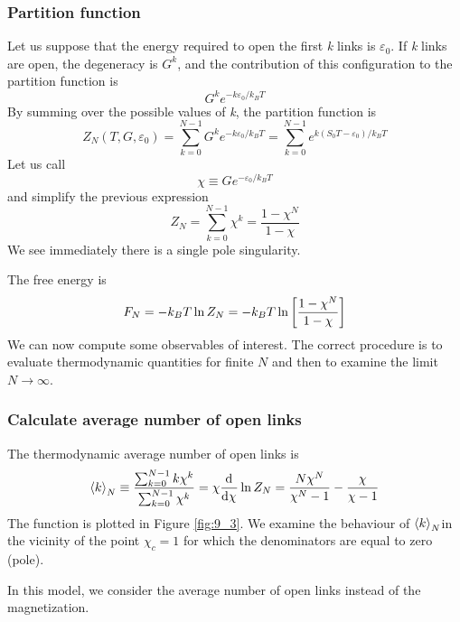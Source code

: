 \documentclass[../../Main/Main.tex]{subfiles}
\begin{document}
\subsubsection{Partition function}
Let us suppose that the energy required to open the first \emph{k} links is \(\varepsilon_0\). If \emph{k} links are open, the degeneracy is \(G^k\), and the contribution of this configuration to the partition function is 
\begin{equation*}
  G^k e^{-k \varepsilon _0/k_B T}
\end{equation*}
By summing over the possible values of \emph{k}, the partition function is
\begin{equation}
  Z_N (T,G, \varepsilon _0) = \sum_{k=0}^{N-1}  G^k e^{-k \varepsilon _0/k_B T} = \sum_{k=0}^{N-1} e^{k(S_0 T - \varepsilon _0)/k_B T}
\end{equation}
Let us call
\begin{equation}
  \chi \equiv G e^{-\varepsilon _0/k_B T}
\end{equation}
and simplify the previous expression
\begin{equation}
  Z_N = \sum_{k=0}^{N-1} \chi ^k = \frac{1-\chi^N}{1-\chi}
\end{equation}
We see immediately there is a single pole singularity.

The free energy is
\begin{equation}
  F_N = -k_B T \ln{Z_N} = -k_B T \ln{\qty[\frac{1-\chi^N}{1-\chi}]}
\end{equation}
We can now compute some observables of interest.
The correct procedure is to evaluate thermodynamic quantities for finite \(N\) and then to examine the limit \( N \rightarrow \infty\).

\subsubsection{Calculate average number of open links}
The thermodynamic average number of open links is
\begin{equation}
  \expval{k}_N \equiv  \frac{\sum_{k=0}^{N-1} k \chi^k}{\sum_{k=0}^{N-1} \chi^k } = \chi \dv[]{}{\chi} \ln{Z_N}  = \frac{N \chi^N}{\chi^N-1} - \frac{\chi}{\chi-1}
\end{equation}
The function is plotted in Figure \ref{fig:9_3}. We examine the behaviour of \( \expval{k}_N \)in the vicinity of the point \( \chi_c = 1 \) for which the denominators are equal to zero (pole).
\begin{remark}
In this model, we consider the average number of open links instead of the magnetization.
\end{remark}
\end{document}
